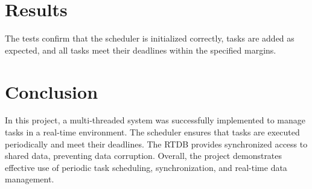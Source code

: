 \documentclass[a4paper,12pt]{article}
\begin{document}
\section{Results}
The tests confirm that the scheduler is initialized correctly, tasks are added as expected, and all tasks meet their deadlines within the specified margins.

\section{Conclusion}
In this project, a multi-threaded system was successfully implemented to manage tasks in a real-time environment. The scheduler ensures that tasks are executed periodically and meet their deadlines. The RTDB provides synchronized access to shared data, preventing data corruption. Overall, the project demonstrates effective use of periodic task scheduling, synchronization, and real-time data management.
\end{document}
